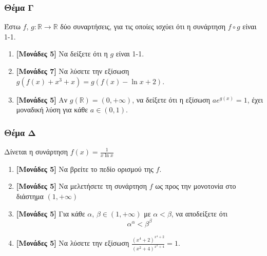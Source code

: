 \documentclass[12pt]{article}
\begin{document}
\section*{Θέμα Γ}
  \noindent
  Έστω $f$, $g:\mathbb{R}\to \mathbb{R}$ δύο συναρτήσεις, για τις οποίες ισχύει ότι η συνάρτηση $f\circ g$ είναι 1-1.
  \begin{enumerate}
    \item \textbf{[Μονάδες 5]} Να δείξετε ότι η $g$ είναι 1-1.
    \item \textbf{[Μονάδες 7]} Να λύσετε την εξίσωση $g\left( f(x)+x^3+x\right)=g\left( f(x)-\ln x+ 2\right)$.
    \item \textbf{[Μονάδες 5]} Αν $g(\mathbb{R})=(0,+\infty)$, να δείξετε ότι η εξίσωση $ae^{g(x)}=1$, έχει μοναδική λύση για κάθε $a\in (0,1)$.
  \end{enumerate}

  \section*{Θέμα Δ}
    \noindent
    Δίνεται η συνάρτηση $f(x)=\frac{1}{x\ln x}$
    \begin{enumerate}
      \item \textbf{[Μονάδες 5]} Να βρείτε το πεδίο ορισμού της $f$.
      \item \textbf{[Μονάδες 5]} Να μελετήσετε τη συνάρτηση $f$ ως προς την μονοτονία στο διάστημα $(1,+\infty)$
      \item \textbf{[Μονάδες 5]} Για κάθε $α$, $β\in (1,+\infty)$ με $α<β$, να αποδείξετε ότι
$$α^α<β^β$$
      \item \textbf{[Μονάδες 5]} Να λύσετε την εξίσωση $\frac{(x^4+2)^{x^4+2}}{(x^2+4)^{x^2+4}}=1$.
    \end{enumerate}

\vspace{3\baselineskip}

\part*{}
\end{document}
